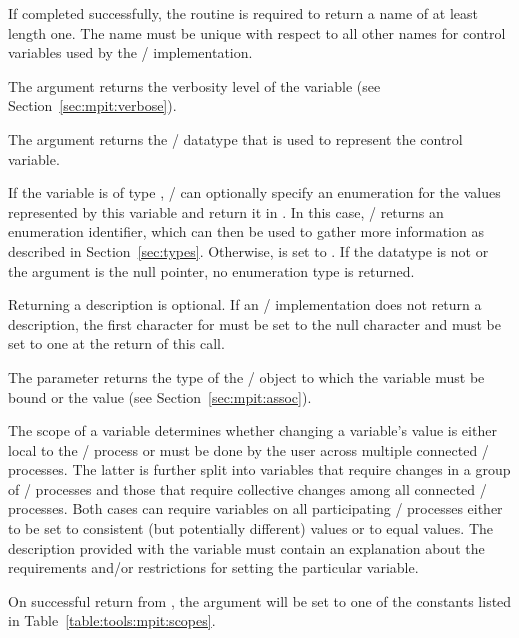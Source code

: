 
If completed successfully, the routine is required to return a name of at
least length one.  The name must be unique with respect to all other names
for control variables used by the \MPI/ implementation.

The argument  returns the verbosity level of the variable
(see Section~\ref{sec:mpit:verbose}).

The argument  returns the \MPI/ datatype that is used to
represent the control variable.

If the variable is of type , \MPI/ can optionally specify
an enumeration for the values represented by this variable and return it in
.  In this case, \MPI/ returns an enumeration identifier,
which can then be used to gather more information as described in
Section~\ref{sec:types}.  Otherwise,  is set to
.  If the datatype is not  or the
argument  is the null pointer, no enumeration type is
returned.


Returning a description is optional.  If an \mpi/ implementation does not
return a description, the first character for  must be set to
the null character and  must be set to one at the return
of this call.

The parameter  returns the type of the \MPI/ object to which
the variable must be bound or the value 
(see Section~\ref{sec:mpit:assoc}).

The scope of a variable determines whether changing a variable's value is
either local to the \MPI/ process or must be done by the user across multiple
connected \MPI/ processes.  The latter is further split into variables that require changes
in a group of \MPI/ processes and those that require collective changes among all
connected \MPI/ processes.  Both cases can require variables on all participating \MPI/ processes either to be set
to consistent (but potentially different) values or to equal values.
The description provided with the variable
must contain an explanation about the requirements and/or restrictions for
setting the particular variable.

On successful return from , the argument
 will be set to one of the constants listed in
Table~\ref{table:tools:mpit:scopes}.

